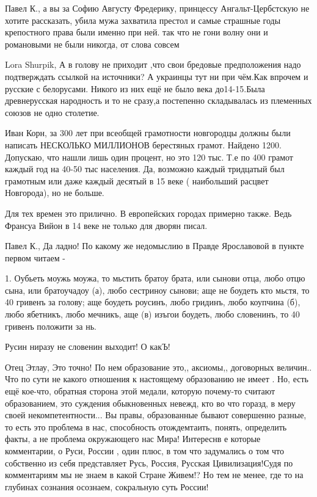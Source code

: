 \begin{itemize}
Павел К., а вы за Софию Августу Фредерику, принцессу Ангальт-Цербстскую не
хотите рассказать, убила мужа захватила престол и самые страшные годы
крепостного права были именно при ней. так что не гони волну они и романовыми
не были никогда, от слова совсем


Lora Shurpik, А в голову не приходит ,что свои бредовые предположения надо
подтверждать ссылкой на источники? А украинцы тут ни при чём.Как впрочем и
русские с белорусами. Никого из них ещё не было века до14-15.Была древнерусская
народность и то не сразу,а постепенно складывалась из племенных союзов не одно
столетие.


Иван Корн, за 300 лет при всеобщей грамотности новгородцы должны были написать
НЕСКОЛЬКО МИЛЛИОНОВ берестяных грамот. Найдено 1200. Допускаю, что нашли лишь
один процент, но это 120 тыс. Т.е по 400 грамот каждый год на 40-50 тыс
населения. Да, возможно каждый тридцатый был грамотным или даже каждый десятый
в 15 веке ( наибольший расцвет Новгорода), но не больше.

Для тех времен это прилично. В европейских городах примерно также. Ведь Франсуа
Вийон в 14 веке не только для дворян писал.


Павел К., Да ладно! По какому же недомыслию в Правде Ярославовой в пункте
первом читаем -

1. Оубьеть моужь моужа, то мьстить братоу брата, или сынови отца, любо отцю
сына, или братоучадоу (а), любо сестриноу сынови; аще не боудеть кто мьстя, то
40 гривенъ за голову; аще боудеть роусинъ, любо гридинъ, любо коупчина (б),
любо ябетникъ, любо мечникъ, аще (в) изъгои боудеть, любо словенинъ, то 40
гривенъ положити за нь.

Русин ниразу не словенин выходит! О какЪ!



Отец Этлау, Это точно! По нем образование это,, аксиомы,, договорных величин..
Что по сути не какого отношения к настоящему образованию не имеет . Но, есть
ещё кое-что, обратная сторона этой медали, которую почему-то считают
образованием, это суждения обыкновенных невежд, кто во что горазд, в меру своей
некомпетентности... Вы правы, образованные бывают совершенно разные, то есть
это проблема в нас, способность отождемтаить, понять, определить факты, а не
проблема окружающего нас Мира! Интереснв е которые комментарии, о Руси, России
, один плюс, в том что задумались о том что собственно из себя представляет
Русь, Россия, Русская Цивилизация!Судя по комментариям мы не знаем в какой
Стране Живем!? Но тем не менее, где то на глубинах сознания осознаем,
сокральную суть России!


\end{itemize}
